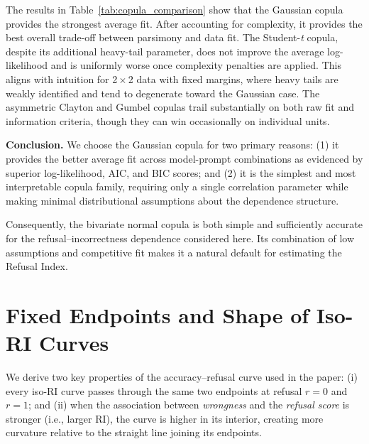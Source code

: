 \documentclass{article} %
\theoremstyle{definition}
\begin{document}
The results in Table~\ref{tab:copula_comparison} show that the Gaussian copula provides the strongest average fit. After accounting for complexity, it provides the best overall trade-off between parsimony and data fit. The Student-\emph{t} copula, despite its additional heavy-tail parameter, does not improve the average log-likelihood and is uniformly worse once complexity penalties are applied. This aligns with intuition for 2\,$\times$\,2 data with fixed margins, where heavy tails are weakly identified and tend to degenerate toward the Gaussian case. The asymmetric Clayton and Gumbel copulas trail substantially on both raw fit and information criteria, though they can win occasionally on individual units.

\noindent\textbf{Conclusion.} We choose the Gaussian copula for two primary reasons: (1) it provides the better average fit across model-prompt combinations as evidenced by superior log-likelihood, AIC, and BIC scores; and (2) it is the simplest and most interpretable copula family, requiring only a single correlation parameter while making minimal distributional assumptions about the dependence structure.

Consequently, the bivariate normal copula is both simple and sufficiently accurate for the refusal--incorrectness dependence considered here. Its combination of low assumptions and competitive fit makes it a natural default for estimating the Refusal Index.

\section{Fixed Endpoints and Shape of Iso-RI Curves}
\label{app:iso_ri_shape}

We derive two key properties of the accuracy--refusal curve used in the paper:
(i) every iso-RI curve passes through the same two endpoints at refusal \(r=0\) and \(r=1\); and
(ii) when the association between \emph{wrongness} and the \emph{refusal score} is stronger (i.e., larger RI), the curve is higher in its interior, creating more curvature relative to the straight line joining its endpoints.
\end{document}
